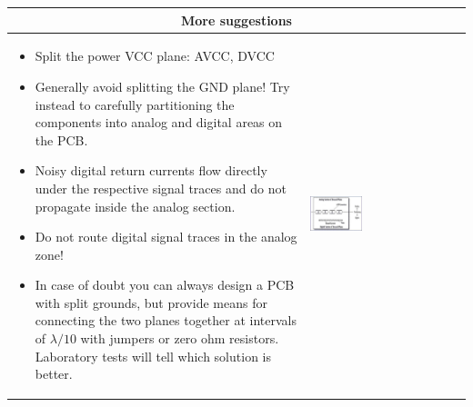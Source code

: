 				\begin{table}[h!]
				\centering
				\begin{tabular}{|m{}|m{}|}

						\multicolumn{2}{c}{\textbf{More suggestions}}
					\\
					\hline
						\begin{itemize}
							\item Split the power VCC plane: AVCC, DVCC
							\item Generally avoid splitting the GND plane! Try instead to carefully partitioning the components into analog and digital areas on the PCB. 
							\item Noisy digital return currents flow directly under the respective signal traces and do not propagate inside the analog section. 
							\item Do not route digital signal traces in the analog zone! 
							\item In case of doubt you can always design a PCB with split grounds, but provide means for connecting the two planes together at intervals of $\lambda/10$ with jumpers or zero ohm resistors. Laboratory tests will tell which solution is better. 
						\end{itemize}
					& 
						\begin{center}\includegraphics[width=0.35\textwidth]{images/PlaneSplit.png}\end{center}  
					\\	
					\hline
					\end{tabular}
				\end{table}	
				
